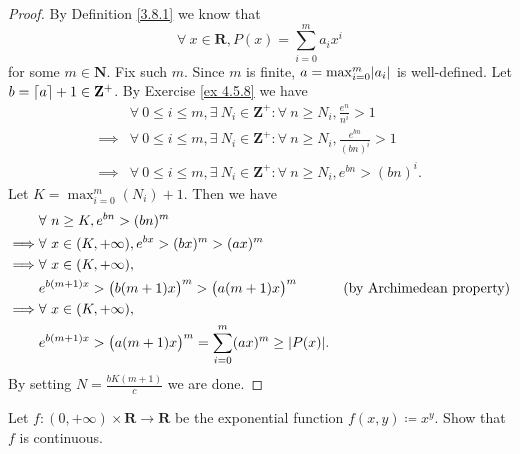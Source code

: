 \begin{proof}
    By Definition \ref{3.8.1} we know that
    \[
        \forall\ x \in \mathbf{R}, P(x) = \sum_{i = 0}^m a_i x^i
    \]
    for some \(m \in \mathbf{N}\).
    Fix such \(m\).
    Since \(m\) is finite, \(a = \max_{i = 0}^m \abs*{a_i}\) is well-defined.
    Let \(b = \lceil a\rceil + 1 \in \mathbf{Z}^+\).
    By Exercise \ref{ex 4.5.8} we have
    \begin{align*}
                 & \forall\ 0 \leq i \leq m, \exists\ N_i \in \mathbf{Z}^+ : \forall\ n \geq N_i, \frac{e^n}{n^i} > 1       \\
        \implies & \forall\ 0 \leq i \leq m, \exists\ N_i \in \mathbf{Z}^+ : \forall\ n \geq N_i, \frac{e^{bn}}{(bn)^i} > 1 \\
        \implies & \forall\ 0 \leq i \leq m, \exists\ N_i \in \mathbf{Z}^+ : \forall\ n \geq N_i, e^{bn} > (bn)^i.
    \end{align*}
    Let \(K = \max_{i = 0}^m(N_i) + 1\).
    Then we have
    \begin{align*}
                 & \forall\ n \geq K, e^{bn} > (bn)^m                                                                                     \\
        \implies & \forall\ x \in (K, +\infty), e^{bx} > (bx)^m > (ax)^m                                                                  \\
        \implies & \forall\ x \in (K, +\infty),                                                                                           \\
                 & e^{b (m + 1) x} > \big(b (m + 1) x\big)^m > \big(a (m + 1) x\big)^m                 & \text{(by Archimedean property)} \\
        \implies & \forall\ x \in (K, +\infty),                                                                                           \\
                 & e^{b (m + 1) x} > \big(a (m + 1) x\big)^m = \sum_{i = 0}^m (ax)^m \geq \abs*{P(x)}.
    \end{align*}
    By setting \(N = \frac{b K (m + 1)}{c}\) we are done.
\end{proof}

\begin{exercise}\label{ex 4.5.10}
    Let \(f : (0, +\infty) \times \mathbf{R} \to \mathbf{R}\) be the exponential function \(f(x, y) \coloneqq x^y\).
    Show that \(f\) is continuous.
\end{exercise}